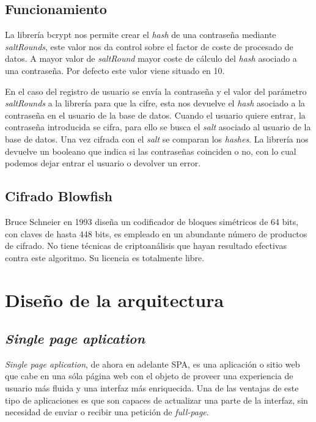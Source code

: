 \subsection{Funcionamiento}
La librería bcrypt nos permite crear el \textit{hash} de una contraseña mediante \textit{saltRounds}, este valor nos da control sobre el factor de coste de procesado de datos. A mayor valor de \textit{saltRound} mayor coste de cálculo del \textit{hash} asociado a una contraseña.  Por defecto este valor viene situado en 10. 


En el caso del registro de usuario se envía la contraseña y el valor del parámetro \textit{saltRounds} a la librería para que la cifre, esta nos devuelve el \textit{hash} asociado a la contraseña en el usuario de la base de datos. Cuando el usuario quiere entrar, la contraseña introducida se cifra, para ello se busca el \textit{salt} asociado al usuario de la base de datos. Una vez cifrada con el \textit{salt} se comparan los \textit{hashes}. La librería nos devuelve un booleano que indica si las contraseñas coinciden o no, con lo cual podemos dejar entrar el usuario o devolver un error.


\subsection{Cifrado Blowfish}
Bruce Schneier en 1993 diseña un codificador de bloques simétricos de 64 bits, con claves de hasta 448 bits, es empleado en un abundante número de productos de cifrado. No tiene técnicas de criptoanálisis que hayan resultado efectivas contra este algoritmo. Su licencia es totalmente libre.


\section{Diseño de la arquitectura}

\subsection{	\textit{Single page aplication}}
\textit{Single page aplication}, de ahora en adelante SPA, es una aplicación o sitio web que cabe en una sóla página web con el objeto de proveer una experiencia de usuario más fluida y una interfaz más enriquecida. Una de las ventajas de este tipo de aplicaciones es que son capaces de actualizar una parte de la interfaz, sin necesidad de enviar o recibir una petición de \textit{full-page}\cite{fernandomonteiro2014}.



